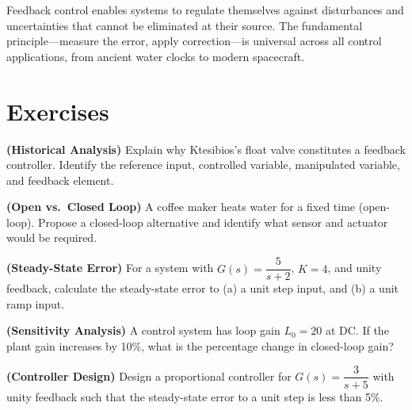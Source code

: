\begin{tcolorbox}[colback=yellow!10!white,colframe=orange!75!black,title=Key Takeaway,sharp corners]
Feedback control enables systems to regulate themselves against disturbances and uncertainties that cannot be eliminated at their source. The fundamental principle---measure the error, apply correction---is universal across all control applications, from ancient water clocks to modern spacecraft.
\end{tcolorbox}

\newpage
\section{Exercises}
\label{sec:exercises}

\begin{exercise}
\textbf{(Historical Analysis)} Explain why Ktesibios's float valve constitutes a feedback controller. Identify the reference input, controlled variable, manipulated variable, and feedback element.
\end{exercise}

\begin{exercise}
\textbf{(Open vs.\ Closed Loop)} A coffee maker heats water for a fixed time (open-loop). Propose a closed-loop alternative and identify what sensor and actuator would be required.
\end{exercise}

\begin{exercise}
\textbf{(Steady-State Error)} For a system with $G(s) = \dfrac{5}{s+2}$, $K = 4$, and unity feedback, calculate the steady-state error to (a) a unit step input, and (b) a unit ramp input.
\end{exercise}

\begin{exercise}
\textbf{(Sensitivity Analysis)} A control system has loop gain $L_0 = 20$ at DC. If the plant gain increases by 10\%, what is the percentage change in closed-loop gain?
\end{exercise}

\begin{exercise}
\textbf{(Controller Design)} Design a proportional controller for $G(s) = \dfrac{3}{s+5}$ with unity feedback such that the steady-state error to a unit step is less than 5\%.
\end{exercise}

